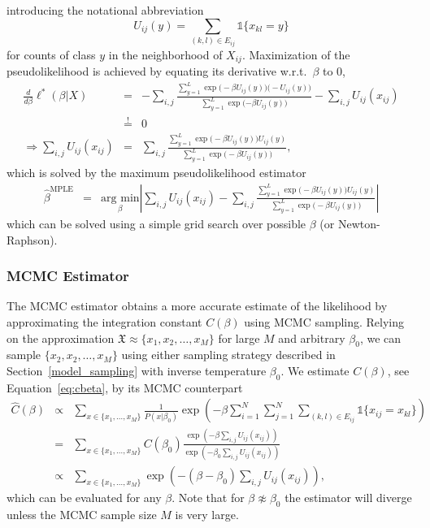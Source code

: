 \documentclass[12pt, twoside]{article}
\newcommand{\1}{\mathbb{1}}
\begin{document}
introducing the notational abbreviation
$$ U_{ij}(y) = \sum_{(k,l) \in E_{ij}} \1 \{x_{kl} = y\} $$
for counts of class $y$ in the neighborhood of $X_{ij}$.
Maximization of the pseudolikelihood is achieved by equating its derivative w.r.t.\ $\beta$ to $0$,
\begin{eqnarray}
\frac{d}{d \beta} \ell^*(\beta | X) &=& -\sum_{i, j} \frac{\sum_{y = 1}^L \exp\big(- \beta  U_{ij}(y)\big) \big(- U_{ij}(y)\big)}{\sum_{y = 1}^L \exp(- \beta  U_{ij}(y)\big)} - \sum_{i, j}  U_{ij}(x_{ij}) \nonumber \\
&\overset{!}{=}& 0 \nonumber \\
\Rightarrow \sum_{i, j}  U_{ij}(x_{ij}) &=& \sum_{i, j} \frac{\sum_{y = 1}^L \exp\big(- \beta  U_{ij}(y)\big) U_{ij}(y)}{\sum_{y = 1}^L \exp\big(- \beta  U_{ij}(y)\big)}, \nonumber
\end{eqnarray}
which is solved by the maximum pseudolikelihood estimator
\begin{eqnarray} \label{eq:beta_MPLE}
\hat \beta^\text{MPLE} &=& \underset{\beta}{\text{arg min}} 
\left| \sum_{i, j}  U_{ij}(x_{ij}) - \sum_{i, j} \frac{\sum_{y = 1}^L \exp\big(- \beta  U_{ij}(y)\big) U_{ij}(y)}{\sum_{y = 1}^L \exp\big(- \beta  U_{ij}(y)\big)} \right|
\end{eqnarray}
which can be solved using a simple grid search over possible $\beta$ (or Newton-Raphson). %


\subsubsection{MCMC Estimator} \label{MCMC_estimator}
The MCMC estimator obtains a more accurate estimate of the likelihood by approximating the integration constant $C(\beta)$ using MCMC sampling. 
%
Relying on the approximation $\mathfrak X \approx \{x_1, x_2, \ldots, x_M\}$ for large $M$ and arbitrary $\beta_0$, we can sample $\{x_2, x_2, \ldots, x_M\}$ using either sampling strategy described in Section~\ref{model_sampling} with inverse temperature $\beta_0$.
%
We estimate $C(\beta)$, see Equation~\eqref{eq:cbeta}, by its MCMC counterpart
\begin{eqnarray} \label{eq:beta_MCMC}
    \hat C(\beta) &\propto&  \sum_{x \in \{x_1, \ldots, x_M\}} \frac{1}{P(x | \beta_0)} \exp \left(-\beta \sum_{i = 1}^N \sum_{j = 1}^N \sum_{(k,l) \in E_{ij}} \1 \{x_{ij} = x_{kl}\}\right) \nonumber \\
    &=& \sum_{x \in \{x_1, \ldots, x_M\}} C(\beta_0) \frac{\exp \left(-\beta \sum_{i, j} U_{ij}(x_{ij})\right)}{\exp \left(-\beta_0 \sum_{i, j} U_{ij}(x_{ij})\right)} \nonumber\\
    &\propto& \sum_{x \in \{x_1, \ldots, x_M\}}  \exp \left(-(\beta - \beta_0) \sum_{i, j} U_{ij}(x_{ij})\right),
\end{eqnarray}
which can be evaluated for any $\beta$. Note that for $\beta \not \approx \beta_0$ the estimator will diverge unless the MCMC sample size $M$ is very large.
\end{document}
